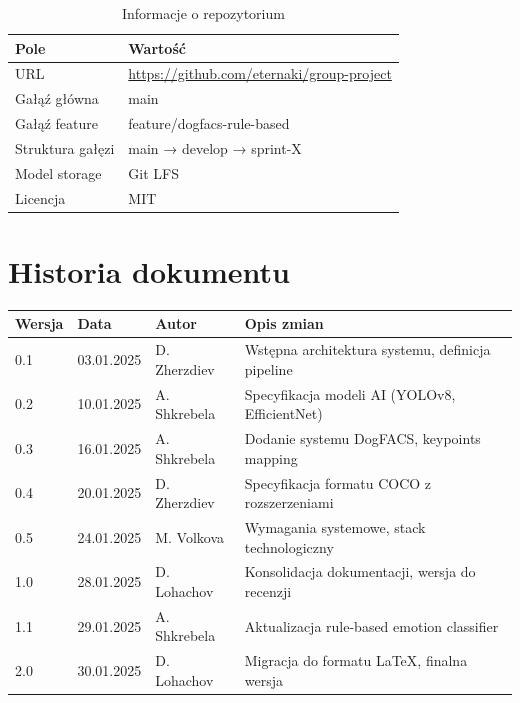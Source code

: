 \documentclass[12pt,a4paper]{article}
\begin{document}
\begin{table}[H]
\centering
\caption{Informacje o repozytorium}
\begin{tabular}{|l|l|}
\hline
\textbf{Pole} & \textbf{Wartość} \\
\hline
URL & \url{https://github.com/eternaki/group-project} \\
Gałąź główna & main \\
Gałąź feature & feature/dogfacs-rule-based \\
Struktura gałęzi & main → develop → sprint-X \\
Model storage & Git LFS \\
Licencja & MIT \\
\hline
\end{tabular}
\end{table}

\section*{Historia dokumentu}

\begin{table}[H]
\centering
\begin{tabular}{|l|l|l|p{6cm}|}
\hline
\textbf{Wersja} & \textbf{Data} & \textbf{Autor} & \textbf{Opis zmian} \\
\hline
0.1 & 03.01.2025 & D. Zherzdiev & Wstępna architektura systemu, definicja pipeline \\
\hline
0.2 & 10.01.2025 & A. Shkrebela & Specyfikacja modeli AI (YOLOv8, EfficientNet) \\
\hline
0.3 & 16.01.2025 & A. Shkrebela & Dodanie systemu DogFACS, keypoints mapping \\
\hline
0.4 & 20.01.2025 & D. Zherzdiev & Specyfikacja formatu COCO z rozszerzeniami \\
\hline
0.5 & 24.01.2025 & M. Volkova & Wymagania systemowe, stack technologiczny \\
\hline
1.0 & 28.01.2025 & D. Lohachov & Konsolidacja dokumentacji, wersja do recenzji \\
\hline
1.1 & 29.01.2025 & A. Shkrebela & Aktualizacja rule-based emotion classifier \\
\hline
2.0 & 30.01.2025 & D. Lohachov & Migracja do formatu LaTeX, finalna wersja \\
\hline
\end{tabular}
\end{table}
\end{document}
